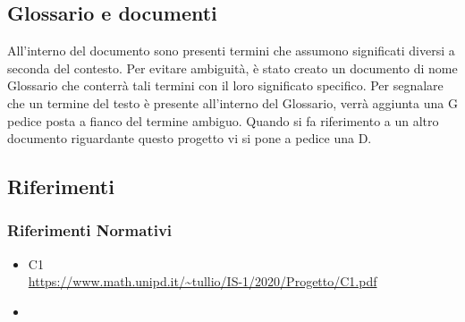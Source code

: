 \subsection{Glossario e documenti} 
All'interno del  documento sono presenti termini che assumono significati diversi a seconda del contesto.
Per evitare ambiguità, è stato creato un  documento di nome Glossario che  conterrà tali termini con il loro significato specifico. Per segnalare che un termine del testo è presente all'interno del Glossario, verrà aggiunta una G pedice posta a fianco del termine ambiguo.
Quando si fa riferimento a un altro documento riguardante questo progetto vi si pone a pedice una D.

\subsection{Riferimenti}
\subsubsection{Riferimenti Normativi}
\begin{itemize}
\item{C1 \\
\url{https://www.math.unipd.it/~tullio/IS-1/2020/Progetto/C1.pdf}}
\item {}
\end{itemize}

